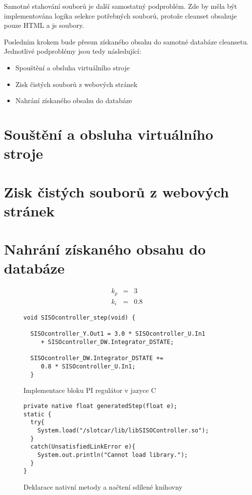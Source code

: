 \documentclass[thesis=M,czech,hidelinks]{FITthesis}[2013/05/06]
\begin{document}
Samotné stahování souborů je další samostatný podproblém. Zde by měla být implementována logika selekce potřebných souborů, protože cleanset obsahuje pouze HTML a js soubory.

Posledním krokem bude přesun získaného obsahu do samotné databáze cleansetu. Jednotlivé podproblémy jsou tedy následující:
\begin{itemize}
	\item Spouštění a obsluha virtuálního stroje
	\item Zisk čistých souborů z webových stránek
	\item Nahrání získaného obsahu do databáze
\end{itemize}

\section{Souštění a obsluha virtuálního stroje}

\section{Zisk čistých souborů z webových stránek}

\section{Nahrání získaného obsahu do databáze}


\begin{eqnarray}
\label{konstanty}
k_p &=& 3 \\ \nonumber
k_i &=& 0.8
\end{eqnarray}

\begin{figure}[h]               
  \begin{verbatim}
void SISOcontroller_step(void) {
  
  SISOcontroller_Y.Out1 = 3.0 * SISOcontroller_U.In1 
     + SISOcontroller_DW.Integrator_DSTATE;
    
  SISOcontroller_DW.Integrator_DSTATE += 
     0.8 * SISOcontroller_U.In1;
  }
  \end{verbatim}      
  \caption{Implementace bloku PI regulátor v jazyce C}
  \label{fig:ctrl.c}
\end{figure}

\begin{figure}[h]               
  \begin{verbatim}
private native float generatedStep(float e); 
static {
  try{
    System.load("/slotcar/lib/libSISOController.so");
  }
  catch(UnsatisfiedLinkError e){
    System.out.println("Cannot load library.");
  }
} 
  \end{verbatim}      
  \caption{Deklarace nativní metody a načtení sdílené knihovny}
  \label{fig:SISO.java}
\end{figure}
\end{document}
